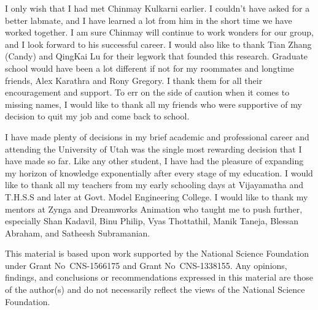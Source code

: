 I only wish that I had met Chinmay Kulkarni earlier. 
I couldn't have asked for a better labmate, and I have learned a lot from him in the short time we have worked together. 
I am sure Chinmay will continue to work wonders for our group, and I look forward to his successful career. 
I would also like to thank Tian Zhang (Candy) and QingKai Lu for their legwork that founded this research. 
Graduate school would have been a lot different if not for my roommates and longtime friends, Alex Karathra and Rony Gregory. 
I thank them for all their encouragement and support. To err on the side of caution when it comes to missing names, I would like to thank all my friends who were supportive of my decision to quit my job and come back to school.

I have made plenty of decisions in my brief academic and professional career and attending the University of Utah was the single most rewarding decision that I have made so far. 
Like any other student, I have had the pleasure of expanding my horizon of knowledge exponentially after every stage of my education. 
I would like to thank all my teachers from my early schooling days at Vijayamatha and T.H.S.S and later at Govt. Model Engineering College. 
I would like to thank my mentors at Zynga and Dreamworks Animation who taught me to push further, especially Shan Kadavil, Binu Philip, Vyas Thottathil, Manik Taneja, Blessan Abraham, and Satheesh Subramanian.

This material is based upon work supported by the National Science Foundation \linebreak under Grant No\ CNS-1566175 and Grant No\ CNS-1338155.
Any opinions, findings, and conclusions or recommendations expressed in this material are those of the author(s) and do not necessarily reflect the views of the National Science Foundation.
